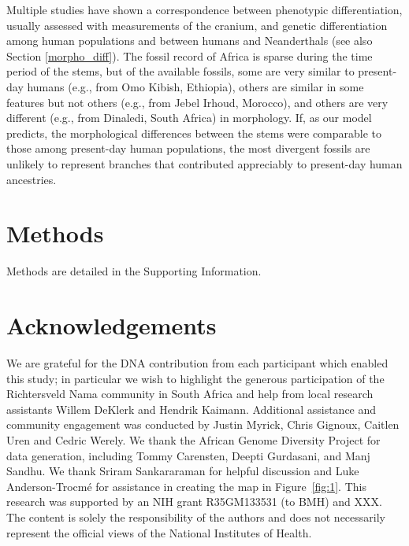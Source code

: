 \documentclass[]{article}
\newcommand{\sgcomment}[1]{{\textcolor{red}{SG: #1}}}
\begin{document}
Multiple studies have shown a correspondence between phenotypic
differentiation, usually assessed with measurements of the cranium, and genetic
differentiation among human populations and between humans and Neanderthals
\citep{Relethford1994-mh,Weaver2008-ho,Von_Cramon-Taubadel2009-zb} (see also Section \ref{morpho_diff}). The fossil
record of Africa is sparse during the time period of the stems, but of the
available fossils, some are very similar to present-day humans (e.g., from Omo
Kibish, Ethiopia), others are similar in some features but not others (e.g.,
from Jebel Irhoud, Morocco), and others are very different (e.g., from
Dinaledi, South Africa) in morphology. If, as our model predicts, the
morphological differences between the stems were comparable to those among
present-day human populations, the most divergent fossils are unlikely to
represent branches that contributed appreciably to present-day human
ancestries. 


\section*{Methods}

Methods are detailed in the Supporting Information.

\section*{Acknowledgements}

We are grateful for the DNA contribution from each participant which enabled
this study; in particular we wish to highlight the generous participation of
the Richtersveld Nama community in South Africa and help from local research
assistants Willem DeKlerk and Hendrik Kaimann. Additional assistance and
community engagement was conducted by Justin Myrick, Chris Gignoux, Caitlen
Uren and Cedric Werely. We thank the African Genome Diversity Project for data
generation, including Tommy Carensten, Deepti Gurdasani, and Manj Sandhu. We
thank Sriram Sankararaman for helpful discussion and Luke Anderson-Trocm\'e for
assistance in creating the map in Figure~\ref{fig:1}. This research was
supported by an NIH grant R35GM133531 (to BMH) and XXX. The content is solely
the responsibility of the authors and does not necessarily represent the
official views of the National Institutes of Health.



\end{document}
